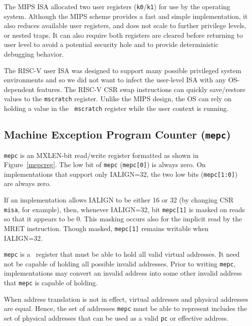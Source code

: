 \begin{commentary}
The MIPS ISA allocated two user registers ({\tt k0}/{\tt k1}) for use
by the operating system.  Although the MIPS scheme provides a fast and
simple implementation, it also reduces available user registers,  and
does not scale to further privilege levels, or nested traps.  It can
also require both registers are cleared before returning to user level
to avoid a potential security hole and to provide deterministic
debugging behavior.

The RISC-V user ISA was designed to support many possible privileged
system environments and so we did not want to infect the user-level
ISA with any OS-dependent features.  The RISC-V CSR swap instructions
can quickly save/restore values to the {\tt mscratch} register.
Unlike the MIPS design, the OS can rely on holding a value in the {\tt
  mscratch} register while the user context is running.
\end{commentary}

\subsection{Machine Exception Program Counter ({\tt mepc})}

{\tt mepc} is an MXLEN-bit read/write register formatted as shown in
Figure~\ref{mepcreg}.  The low bit of {\tt mepc} ({\tt mepc[0]}) is
always zero.  On implementations that support only IALIGN=32, the two low bits
({\tt mepc[1:0]}) are always zero.

If an implementation allows IALIGN to be either 16 or 32 (by
changing CSR {\tt misa}, for example), then, whenever IALIGN=32, bit
{\tt mepc[1]} is masked on reads so that it appears to be 0.  This
masking occurs also for the implicit read by the MRET instruction.
Though masked, {\tt mepc[1]} remains writable when IALIGN=32.

{\tt mepc} is a \warl\ register that must be able to hold all valid
virtual addresses.  It need not be capable of holding all possible invalid
addresses.
Prior to writing {\tt mepc}, implementations may convert an invalid address
into some other invalid address that {\tt mepc} is capable of holding.

\begin{commentary}
When address translation is not in effect, virtual addresses and physical
addresses are equal.
Hence, the set of addresses {\tt mepc} must be able to represent includes the
set of physical addresses that can be used as a valid {\tt pc} or effective
address.
\end{commentary}

